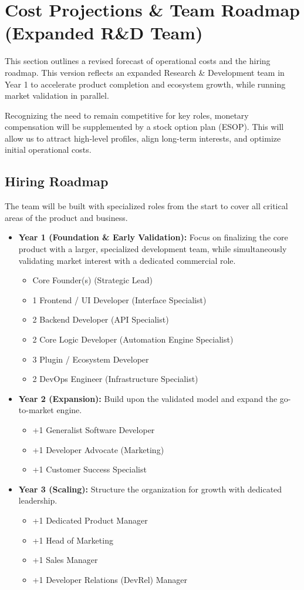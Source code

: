 \documentclass[11pt, a4paper, oneside]{article}
\begin{document}
\section*{Cost Projections \& Team Roadmap (Expanded R\&D Team)}
This section outlines a revised forecast of operational costs and the hiring roadmap. This version reflects an expanded Research \& Development team in Year 1 to accelerate product completion and ecosystem growth, while running market validation in parallel.

Recognizing the need to remain competitive for key roles, monetary compensation will be supplemented by a stock option plan (ESOP). This will allow us to attract high-level profiles, align long-term interests, and optimize initial operational costs.

\subsection*{Hiring Roadmap}
The team will be built with specialized roles from the start to cover all critical areas of the product and business.
\begin{itemize}
    \item \textbf{Year 1 (Foundation \& Early Validation):} Focus on finalizing the core product with a larger, specialized development team, while simultaneously validating market interest with a dedicated commercial role.
    \begin{itemize}
        \item Core Founder(s) (Strategic Lead)
        \item 1 Frontend / UI Developer (Interface Specialist)
        \item 2 Backend Developer (API Specialist)
        \item 2 Core Logic Developer (Automation Engine Specialist)
        \item 3 Plugin / Ecosystem Developer
        \item 2 DevOps Engineer (Infrastructure Specialist)
    \end{itemize}
    \item \textbf{Year 2 (Expansion):} Build upon the validated model and expand the go-to-market engine.
    \begin{itemize}
        \item +1 Generalist Software Developer
        \item +1 Developer Advocate (Marketing)
        \item +1 Customer Success Specialist
    \end{itemize}
    \item \textbf{Year 3 (Scaling):} Structure the organization for growth with dedicated leadership.
    \begin{itemize}
        \item +1 Dedicated Product Manager
        \item +1 Head of Marketing
        \item +1 Sales Manager
        \item +1 Developer Relations (DevRel) Manager
    \end{itemize}
\end{itemize}
\end{document}
